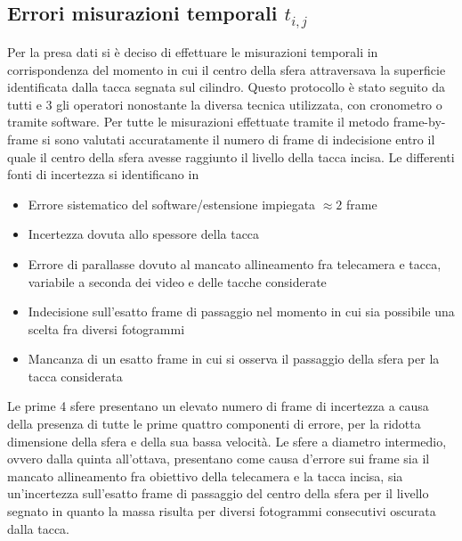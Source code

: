 \documentclass[a4paper,11pt,oneside]{article}
\begin{document}
\subsection{Errori misurazioni temporali $t_{i,j}$}
Per la presa dati si è deciso di effettuare le misurazioni temporali in corrispondenza del momento in cui il centro della sfera attraversava la superficie identificata dalla tacca segnata sul cilindro. Questo protocollo è stato seguito da tutti e 3 gli operatori nonostante la diversa tecnica utilizzata, con cronometro o tramite software.
Per tutte le misurazioni effettuate tramite il metodo frame-by-frame si sono valutati accuratamente il numero di frame di indecisione entro il quale il centro della sfera avesse raggiunto il livello della tacca incisa.
Le differenti fonti di incertezza si identificano in
\begin{itemize}
    \item Errore sistematico del software/estensione impiegata $\approx 2 $ frame
    \item Incertezza dovuta allo spessore della tacca
    \item Errore di parallasse dovuto al mancato allineamento fra telecamera e tacca, variabile a seconda dei video e delle tacche considerate
    \item Indecisione sull'esatto frame di passaggio nel momento in cui sia possibile una scelta fra diversi fotogrammi
    \item Mancanza di un esatto frame in cui si osserva il passaggio della sfera per la tacca considerata
\end{itemize}
Le prime 4 sfere presentano un elevato numero di frame di incertezza a causa della presenza di tutte le prime quattro componenti di errore, per la ridotta dimensione della sfera e della sua bassa velocità.
Le sfere a diametro intermedio, ovvero dalla quinta all'ottava, presentano come causa d'errore sui frame  sia il mancato allineamento fra obiettivo della telecamera  e la tacca incisa, sia un'incertezza sull'esatto frame di passaggio del centro della sfera per il livello segnato in quanto la massa risulta per diversi fotogrammi consecutivi oscurata dalla tacca. \\
\end{document}
